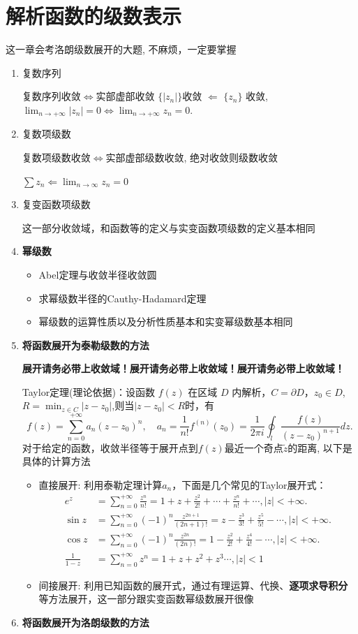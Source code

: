 \documentclass[a4paper,11pt,UTF8]{article}
\begin{document}
\section{解析函数的级数表示}
这一章会考洛朗级数展开的大题, 不麻烦，一定要掌握
\begin{enumerate}
	\item 复数序列
	
	复数序列收敛$\Leftrightarrow$实部虚部收敛
	$\{|z_n|\}$收敛 $\Leftarrow$ $\{z_n\}$ 收敛,  $\lim_{n\to+\infty}|z_n|=0\Leftrightarrow\lim_{n\to+\infty} z_n=0.$
	\item 复数项级数
	
	复数项级数收敛$\Leftrightarrow$实部虚部级数收敛, 绝对收敛则级数收敛
	
	$\sum z_n\Leftarrow \lim_{n\to\infty}z_n=0$
	\item 复变函数项级数
	
	这一部分收敛域，和函数等的定义与实变函数项级数的定义基本相同
	\item \textbf{幂级数}
	\begin{itemize}
		\item Abel定理与收敛半径收敛圆
		\item 求幂级数半径的Cauthy-Hadamard定理
		\item 幂级数的运算性质以及分析性质基本和实变幂级数基本相同
	\end{itemize}
	\item \textbf{将函数展开为泰勒级数的方法}
	
	\textbf{展开请务必带上收敛域！展开请务必带上收敛域！展开请务必带上收敛域！}
	
	Taylor定理(理论依据)：设函数 $f(z)$ 在区域 $D$ 内解析，$C=\partial D$，$z_0\in D$, $R=\min_{z\in C}
	|z-z_0|$,则当$|z-z_0|<R$时，有
	$$
	f(z)=\sum_{n=0}^{+\infty}a_n(z-z_0)^n,\quad a_n=\frac1{n!}f^{(n)}(z_0)=\frac1{2\pi i}\oint_l\frac{f(z)}{\left(z-z_0\right)^{n+1}}dz.
	$$
	对于给定的函数，收敛半径等于展开点到$f(z)$最近一个奇点$\tilde{z}$的距离, 以下是具体的计算方法
	\begin{itemize}
		\item 直接展开: 利用泰勒定理计算$a_n$，下面是几个常见的Taylor展开式：
		\begin{align*}
			{e}^{z}&=\sum_{n=0}^{+\infty}\frac{z^{n}}{n!}={1}+z+\frac{z^{2}}{2!}+\cdots+\frac{z^{n}}{n!}+\cdots,|z|<+\infty.\\
			\sin z &=\sum_{n=0}^{+\infty}(-1)^n\frac{z^{2n+1}}{(2n+1)!}=z-\frac{z^3}{3!}+\frac{z^5}{5!}-\cdots,|z|<+\infty. \\
			\cos z&=\sum_{n=0}^{+\infty}(-1)^n\frac{z^{2n}}{(2n)!}=1-\frac{z^2}{2!}+\frac{z^4}{4!}-\cdots,|z|<+\infty. \\
			\frac1{1-z}&=\sum_{n=0}^{+\infty}z^n=1+z+z^2+z^3\cdots, |z|<1
		\end{align*}
		\item 间接展开: 利用已知函数的展开式，通过有理运算、代换、\textbf{逐项求导积分}等方法展开，这一部分跟实变函数幂级数展开很像
	\end{itemize}
	\item \textbf{将函数展开为洛朗级数的方法}
	

\end{enumerate}
\end{document}

